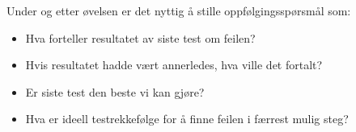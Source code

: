 Under og etter øvelsen er det nyttig å stille oppfølgingsspørsmål som:

\begin{itemize}
\item{} Hva forteller resultatet av siste test om feilen?
\item{} Hvis resultatet hadde vært annerledes, hva ville det fortalt?
\item{} Er siste test den beste vi kan gjøre?
\item{} Hva er ideell testrekkefølge for å finne feilen i færrest mulig steg?
\end{itemize}


